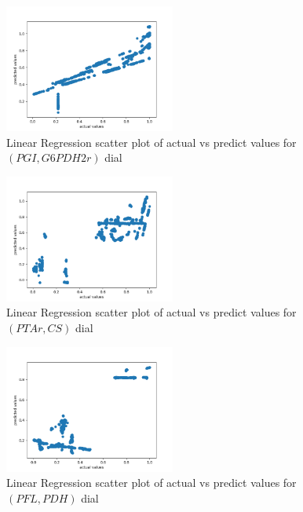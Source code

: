 \documentclass[12pt,chapterheads]{ucsd}
\begin{document}
\begin{figure}[h] 
\centering
\includegraphics[width=0.5\textwidth]{PGI_G6PDH2r_lr.png}
\caption[Linear Regression scatter plot of actual vs predict values for $(PGI, G6PDH2r)$ dial]
{Linear Regression scatter plot of actual vs predict values for $(PGI, G6PDH2r)$ dial}
\label{fig:PgiG6pdh2rLr}
\end{figure}

\begin{figure}[h] 
\centering
\includegraphics[width=0.5\textwidth]{PTAr_CS_lr}
\caption[Linear Regression scatter plot of actual vs predict values for $(PTAr, CS)$ dial]
{Linear Regression scatter plot of actual vs predict values for $(PTAr, CS)$ dial}
\label{fig:PtarCsLr}
\end{figure}

\begin{figure}[h] 
\centering
\includegraphics[width=0.5\textwidth]{PFL_PDH_lr}
\caption[Linear Regression scatter plot of actual vs predict values for $(PFL, PDH)$ dial]
{Linear Regression scatter plot of actual vs predict values for $(PFL, PDH)$ dial}
\label{fig:PflPdhLr}
\end{figure}
\end{document}
